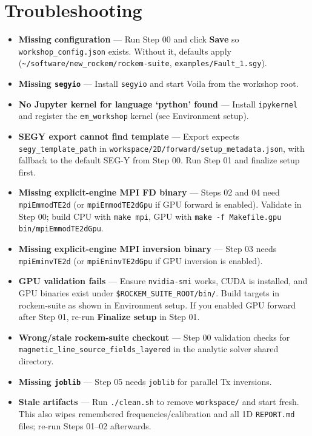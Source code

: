 \documentclass[11pt,a4paper]{article}
\begin{document}
\section{Troubleshooting}

\begin{itemize}
  \item \textbf{Missing configuration} — Run Step 00 and click \textbf{Save} so \texttt{workshop\_config.json} exists. Without it, defaults apply (\texttt{\textasciitilde/software/new\_rockem/rockem-suite}, \texttt{examples/Fault\_1.sgy}).
  \item \textbf{Missing \texttt{segyio}} — Install \texttt{segyio} and start Voila from the workshop root.
  \item \textbf{No Jupyter kernel for language `python' found} — Install \texttt{ipykernel} and register the \texttt{em\_workshop} kernel (see Environment setup).
  \item \textbf{SEGY export cannot find template} — Export expects \texttt{segy\_template\_path} in \texttt{workspace/2D/forward/setup\_metadata.json}, with fallback to the default SEG-Y from Step 00. Run Step 01 and finalize setup first.
  \item \textbf{Missing explicit-engine MPI FD binary} — Steps 02 and 04 need \texttt{mpiEmmodTE2d} (or \texttt{mpiEmmodTE2dGpu} if GPU forward is enabled). Validate in Step 00; build CPU with \texttt{make mpi}, GPU with \texttt{make -f Makefile.gpu bin/mpiEmmodTE2dGpu}.
  \item \textbf{Missing explicit-engine MPI inversion binary} — Step 03 needs \texttt{mpiEminvTE2d} (or \texttt{mpiEminvTE2dGpu} if GPU inversion is enabled).
  \item \textbf{GPU validation fails} — Ensure \texttt{nvidia-smi} works, CUDA is installed, and GPU binaries exist under \texttt{\$ROCKEM\_SUITE\_ROOT/bin/}. Build targets in rockem-suite as shown in Environment setup. If you enabled GPU forward after Step 01, re-run \textbf{Finalize setup} in Step 01.
  \item \textbf{Wrong/stale rockem-suite checkout} — Step 00 validation checks for \texttt{magnetic\_line\_source\_fields\_layered} in the analytic solver shared directory.
  \item \textbf{Missing \texttt{joblib}} — Step 05 needs \texttt{joblib} for parallel Tx inversions.
  \item \textbf{Stale artifacts} — Run \texttt{./clean.sh} to remove \texttt{workspace/} and start fresh. This also wipes remembered frequencies/calibration and all 1D \texttt{REPORT.md} files; re-run Steps 01--02 afterwards.
\end{itemize}
\end{document}
